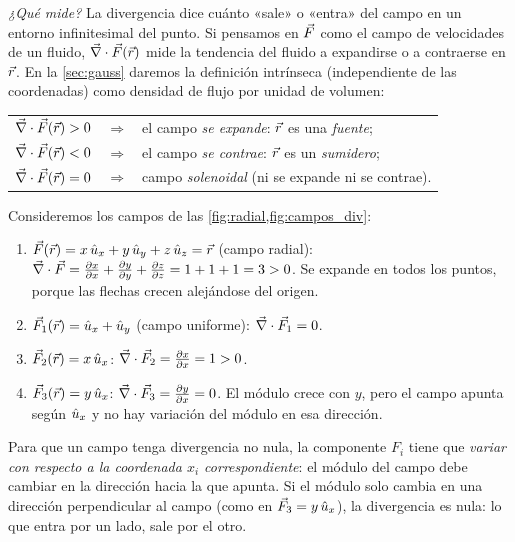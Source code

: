 \emph{¿Qué mide?} La divergencia dice cuánto «sale» o «entra» del campo en un
entorno infinitesimal del punto. Si pensamos en $\vec{F}$ como el campo de
velocidades de un fluido, $\vec{\nabla}\cdot\vec{F}(\vec{r})$ mide la tendencia del fluido
a expandirse o a contraerse en $\vec{r}$. En la \cref{sec:gauss} daremos la
definición intrínseca (independiente de las coordenadas) como densidad de flujo
por unidad de volumen:
\begin{center}
\begin{tabular}{@{}lll@{}}
$\vec{\nabla}\cdot\vec{F}(\vec{r})>0$ & $\Rightarrow$ & el campo \emph{se expande}: $\vec{r}$ es una \emph{fuente};\\
$\vec{\nabla}\cdot\vec{F}(\vec{r})<0$ & $\Rightarrow$ & el campo \emph{se contrae}: $\vec{r}$ es un \emph{sumidero};\\
$\vec{\nabla}\cdot\vec{F}(\vec{r})=0$ & $\Rightarrow$ & campo \emph{solenoidal} (ni se expande ni se contrae).
\end{tabular}
\end{center}

\begin{ejemplo}\label{ej:div}
Consideremos los campos de las \cref{fig:radial,fig:campos_div}:
\begin{enumerate}[label=(\roman*)]
  \item $\vec{F}(\vec{r})=x\,\hat{u}_{x}+y\,\hat{u}_{y}+z\,\hat{u}_{z}=\vec{r}$ (campo radial):
        $\vec{\nabla}\cdot\vec{F}=\frac{\partial x}{\partial x}+\frac{\partial y}{\partial y}+\frac{\partial z}{\partial z}=1+1+1=3>0$. Se expande en
        todos los puntos, porque las flechas crecen alejándose del origen.
  \item $\vec{F}_1(\vec{r})=\hat{u}_{x}+\hat{u}_{y}$ (campo uniforme): $\vec{\nabla}\cdot\vec{F}_1=0$.
  \item $\vec{F}_2(\vec{r})=x\,\hat{u}_{x}$: $\vec{\nabla}\cdot\vec{F}_2=\frac{\partial x}{\partial x}=1>0$.
  \item $\vec{F}_3(\vec{r})=y\,\hat{u}_{x}$: $\vec{\nabla}\cdot\vec{F}_3=\frac{\partial y}{\partial x}=0$. El módulo
        crece con $y$, pero el campo apunta según $\hat{u}_{x}$ y no hay variación del
        módulo en esa dirección.
\end{enumerate}
\end{ejemplo}

\begin{observacion}\label{obs:cuando-div}
Para que un campo tenga divergencia no nula, la componente $F_i$ tiene que
\emph{variar con respecto a la coordenada $x_i$ correspondiente}: el módulo
del campo debe cambiar en la dirección hacia la que apunta. Si el módulo solo
cambia en una dirección perpendicular al campo (como en $\vec{F}_3=y\,\hat{u}_{x}$), la
divergencia es nula: lo que entra por un lado, sale por el otro.
\end{observacion}

